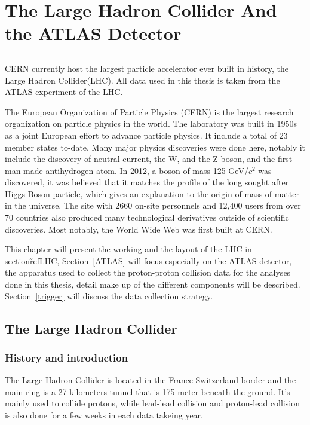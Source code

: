 \chapter{The Large Hadron Collider And the ATLAS Detector}
\label{chapter:ATLAS}
\section{}


CERN currently host the largest particle accelerator ever built in history, the Large Hadron Collider(LHC). All data used in this thesis is taken from the ATLAS experiment of the LHC. 

The European Organization of Particle Physics (CERN) is the largest research organization on particle physics in the world. The laboratory was built in 1950s as a joint European effort to advance particle physics. It include a total of 23 member states to-date. Many major physics discoveries were done here, notably it include the discovery of neutral current, the W, and the Z boson, and the first man-made antihydrogen atom. In 2012, a boson of mass 125 GeV/$c^{2}$ was discovered, it was believed that it matches the profile of the long sought after Higgs Boson particle, which gives an explanation to the origin of mass of matter in the universe. The site with 2660 on-site personnels and 12,400 users from over 70 countries also produced many technological derivatives outside of scientific discoveries. Most notably, the World Wide Web was first built at CERN.

This chapter will present the working and the layout of the LHC in section\~ref{LHC}, Section~\ref{ATLAS} will focus especially on the ATLAS detector, the apparatus used to collect the proton-proton collision data for the analyses done in this thesis, detail make up of the different components will be described. Section~\ref{trigger} will discuss the data collection strategy.


\section{The Large Hadron Collider}
\label{LHC}
\subsection{History and introduction}

The Large Hadron Collider is located in the France-Switzerland border and the main ring is a 27 kilometers tunnel that is 175 meter beneath the ground. It's mainly used to collide protons, while lead-lead collision and proton-lead collision is also done for a few weeks in each data takeing year. 

